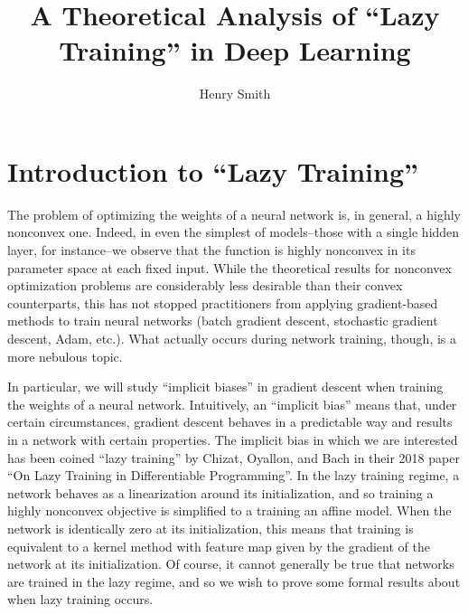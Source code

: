 \documentclass{article}
\title{\textbf{A Theoretical Analysis of \enquote{Lazy Training} in Deep Learning}}
\author[]{Henry Smith}
\date{\vspace{-5ex}}
\begin{document}
\maketitle

\section{Introduction to \enquote{Lazy Training}}
The problem of optimizing the weights of a neural network is, in general, a highly nonconvex one. Indeed, in even the simplest of models--those with a single hidden layer, for instance--we observe that the function is highly nonconvex in its parameter space at each fixed input. While the theoretical results for nonconvex optimization problems are considerably less desirable than their convex counterparts, this has not stopped practitioners from applying gradient-based methods to train neural networks (batch gradient descent, stochastic gradient descent, Adam, etc.). What actually occurs during network training, though, is a more nebulous topic. 

In particular, we will study \enquote{implicit biases} in gradient descent when training the weights of a neural network. Intuitively, an \enquote{implicit bias} means that, under certain circumstances, gradient descent behaves in a predictable way and results in a network with certain properties. The implicit bias in which we are interested has been coined \enquote{lazy training} by Chizat, Oyallon, and Bach in their 2018 paper \enquote{On Lazy Training in Differentiable Programming}. In the lazy training regime, a network behaves as a linearization around its initialization, and so training a highly nonconvex objective is simplified to a training an affine model. When the network is identically zero at its initialization, this means that training is equivalent to a kernel method with feature map given by the gradient of the network at its initialization. Of course, it cannot generally be true that networks are trained in the lazy regime, and so we wish to prove some formal results about when lazy training occurs.
\end{document}
